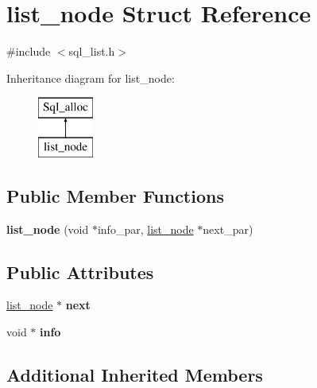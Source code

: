 \hypertarget{structlist__node}{}\section{list\+\_\+node Struct Reference}
\label{structlist__node}


{\ttfamily \#include $<$sql\+\_\+list.\+h$>$}

Inheritance diagram for list\+\_\+node\+:\begin{figure}[H]
\begin{center}
\leavevmode
\includegraphics[height=2.000000cm]{structlist__node}
\end{center}
\end{figure}
\subsection*{Public Member Functions}
\begin{DoxyCompactItemize}
\item 
\mbox{\label{structlist__node_a352d91575ac2aeeaf8ec03aa0dd157db}} 
{\bfseries list\+\_\+node} (void $\ast$info\+\_\+par, \mbox{\hyperlink{structlist__node}{list\+\_\+node}} $\ast$next\+\_\+par)
\end{DoxyCompactItemize}
\subsection*{Public Attributes}
\begin{DoxyCompactItemize}
\item 
\mbox{\label{structlist__node_a06fcc4d5b5a58db30e21212f46ccc073}} 
\mbox{\hyperlink{structlist__node}{list\+\_\+node}} $\ast$ {\bfseries next}
\item 
\mbox{\label{structlist__node_af3d6db6965d211b177f20cfd7a06c5a4}} 
void $\ast$ {\bfseries info}
\end{DoxyCompactItemize}
\subsection*{Additional Inherited Members}



